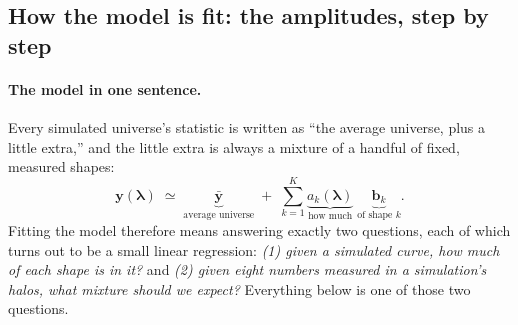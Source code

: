 
\subsection{How the model is fit: the amplitudes, step by step}
\label{sec:amp-methods}

\paragraph{The model in one sentence.}
Every simulated universe's statistic is written as ``the average universe,
plus a little extra,'' and the little extra is always a mixture of a
handful of fixed, measured shapes:
\begin{equation}
\mathbf{y}(\boldsymbol{\lambda})
\;\simeq\;
\underbrace{\bar{\mathbf{y}}}_{\text{average universe}}
\;+\;
\sum_{k=1}^{K}
\underbrace{a_k(\boldsymbol{\lambda})}_{\text{how much}}\;
\underbrace{\mathbf{b}_k}_{\text{of shape }k}.
\end{equation}
Fitting the model therefore means answering exactly two questions, each of
which turns out to be a small linear regression: \emph{(1) given a
simulated curve, how much of each shape is in it?} and \emph{(2) given
eight numbers measured in a simulation's halos, what mixture should we
expect?}  Everything below is one of those two questions.

